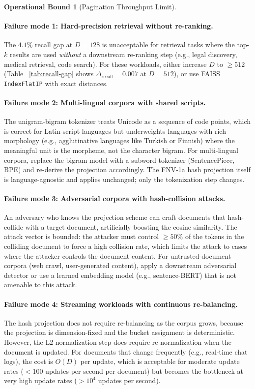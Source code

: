 \documentclass[10pt,twocolumn]{article}
\theoremstyle{definition}
\newtheorem{operationalbound}[theorem]{Operational Bound}
\theoremstyle{remark}
\begin{document}
\begin{operationalbound}[Pagination Throughput Limit]
\paragraph{Failure mode 1: Hard-precision retrieval without re-ranking.}
The $4.1\%$ recall gap at $D = 128$ is unacceptable for retrieval
tasks where the top-$k$ results are used \emph{without} a downstream
re-ranking step (e.g., legal discovery, medical retrieval, code search).
For these workloads, either increase $D$ to $\ge 512$ (Table~
\ref{tab:recall-gap} shows $\Delta_{\mathrm{recall}} = 0.007$ at $D =
512$), or use FAISS \texttt{IndexFlatIP} with exact distances.

\paragraph{Failure mode 2: Multi-lingual corpora with shared scripts.}
The unigram-bigram tokenizer treats Unicode as a sequence of code
points, which is correct for Latin-script languages but underweights
languages with rich morphology (e.g., agglutinative languages like
Turkish or Finnish) where the meaningful unit is the morpheme, not the
character bigram. For multi-lingual corpora, replace the bigram model
with a subword tokenizer (SentencePiece, BPE) and re-derive the
projection accordingly. The FNV-1a hash projection itself is
language-agnostic and applies unchanged; only the tokenization step
changes.

\paragraph{Failure mode 3: Adversarial corpora with hash-collision attacks.}
An adversary who knows the projection scheme can craft documents that
hash-collide with a target document, artificially boosting the cosine
similarity. The attack vector is bounded: the attacker must control
$\ge 50\%$ of the tokens in the colliding document to force a high
collision rate, which limits the attack to cases where the attacker
controls the document content. For untrusted-document corpora (web
crawl, user-generated content), apply a downstream adversarial
detector or use a learned embedding model (e.g., sentence-BERT) that
is not amenable to this attack.

\paragraph{Failure mode 4: Streaming workloads with continuous re-balancing.}
The hash projection does not require re-balancing as the corpus grows,
because the projection is dimension-fixed and the bucket assignment
is deterministic. However, the L2 normalization step does require
re-normalization when the document is updated. For documents that
change frequently (e.g., real-time chat logs), the cost is $O(D)$ per
update, which is acceptable for moderate update rates ($< 100$ updates
per second per document) but becomes the bottleneck at very high update
rates ($> 10^4$ updates per second).


\end{operationalbound}
\end{document}
